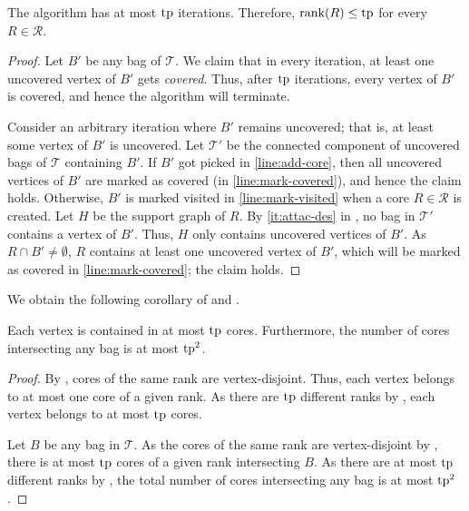 \documentclass{article}
\newcommand{\tp}{{\rm tp}}
\newcommand{\mt}{\mathcal{T}}
\newcommand{\rank}{\mathrm{rank}}
\def\coreSet{\mathcal{R}}
\def\core{R}
\begin{document}
\begin{lemma}\label{lem:numberiterations}
	The algorithm has at most $\tp$ iterations. Therefore, $\rank(\core) \leq \tp$ for every $\core \in \coreSet$.
\end{lemma}
\begin{proof}
	Let $B'$ be any bag of $\mt$. We claim that in every iteration, at least one uncovered vertex of $B'$ gets \emph{covered}. Thus, after $\tp$ iterations, every vertex of $B'$ is covered, and hence the algorithm will terminate.
	
	Consider an arbitrary iteration where $B'$ remains uncovered; that is, at least some vertex of $B'$ is uncovered. Let $\mt'$ be the connected component of uncovered bags of $\mt$ containing $B'$. If $B'$ got picked in \cref{line:add-core}, then all uncovered vertices of $B'$ are marked as covered (in \cref{line:mark-covered}), and hence the claim holds. Otherwise, $B'$ is marked visited in \cref{line:mark-visited} when a core $\core \in \coreSet$ is created. Let $H$ be the support graph of $\core$. By \cref{it:attac-des} in , no bag in $\mt'$ contains a vertex of $B'$. Thus, $H$ only contains uncovered vertices of $B'$. As $\core\cap B' \not=\emptyset$, $\core$ contains at least one uncovered vertex of $B'$, which will be marked as covered in \cref{line:mark-covered}; the claim holds.  
\end{proof}


We obtain the following corollary of  and .

\begin{corollary}\label{cor:core-bag-intersect} Each vertex is contained in at most $\tp$ cores. Furthermore, the number of cores intersecting any bag is at most $\tp^2$.
\end{corollary}
\begin{proof}
	By ,  cores of the same rank are vertex-disjoint. Thus, each vertex belongs to at most one core of a given rank. As there are $\tp$ different ranks by , each vertex belongs to at most $\tp$ cores. 
	
	Let $B$ be any bag in $\mt$. As the cores of the same rank are vertex-disjoint by , there is at most $\tp$ cores of a given rank intersecting $B$. As there are at most $\tp$ different ranks by  , the total number of cores intersecting any bag is at most $\tp^2$.
\end{proof}
\end{document}

